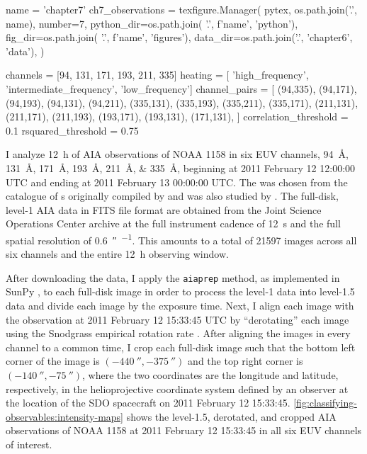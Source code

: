 \begin{pycode}
name = 'chapter7'
ch7_observations = texfigure.Manager(
    pytex,
    os.path.join('.', name),
    number=7,
    python_dir=os.path.join( '.', f'{name}', 'python'),
    fig_dir=os.path.join( '.', f'{name}', 'figures'),
    data_dir=os.path.join('.', 'chapter6', 'data'),
)

channels = [94, 131, 171, 193, 211, 335]
heating = [ 'high_frequency', 'intermediate_frequency', 'low_frequency']
channel_pairs = [
    (94,335),
    (94,171),
    (94,193),
    (94,131),
    (94,211),
    (335,131),
    (335,193),
    (335,211),
    (335,171),
    (211,131),
    (211,171),
    (211,193),
    (193,171),
    (193,131),
    (171,131),
]
correlation_threshold = 0.1
rsquared_threshold = 0.75
\end{pycode}

I analyze \SI{12}{\hour} of AIA observations of \AR{} NOAA 1158 in six EUV channels, \SIlist{94;131;171;193;211;335}{\angstrom}, beginning at 2011 February 12 12:00:00 UTC and ending at 2011 February 13 00:00:00 UTC. The \AR{} was chosen from the catalogue of \AR s originally compiled by \citet{warren_systematic_2012} and was also studied by \citet{viall_survey_2017}. The full-disk, level-1 AIA data in FITS file format are obtained from the Joint Science Operations Center \citep[JSOC,][]{couvidat_observables_2016} archive at the full instrument cadence of \SI{12}{\second} and the full spatial resolution of \SI{0.6}{\arcsecond\per\pixel}. This amounts to a total of 21597 images across all six channels and the entire \SI{12}{\hour} observing window.

After downloading the data, I apply the \texttt{aiaprep} method, as implemented in SunPy \citep{sunpy_community_sunpypython_2015}, to each full-disk image in order to process the level-1 data into level-1.5 data and divide each image by the exposure time. Next, I align each image with the observation at 2011 February 12 15:33:45 UTC \citep[the time of the original observation of NOAA 1158 by][]{warren_systematic_2012} by ``derotating'' each image using the Snodgrass empirical rotation rate \citep{snodgrass_magnetic_1983}. After aligning the images in every channel to a common time, I crop each full-disk image such that the bottom left corner of the image is $(\SI{-440}{\arcsecond},\SI{-375}{\arcsecond})$ and the top right corner is $(\SI{-140}{\arcsecond},\SI{-75}{\arcsecond})$, where the two coordinates are the longitude and latitude, respectively, in the helioprojective coordinate system \citep[see][and \autoref{sec:coordinates}]{thompson_coordinate_2006} defined by an observer at the location of the SDO spacecraft on 2011 February 12 15:33:45. \autoref{fig:classifying-observables:intensity-maps} shows the level-1.5, derotated, and cropped AIA observations of \AR{} NOAA 1158 at 2011 February 12 15:33:45 in all six EUV channels of interest.


